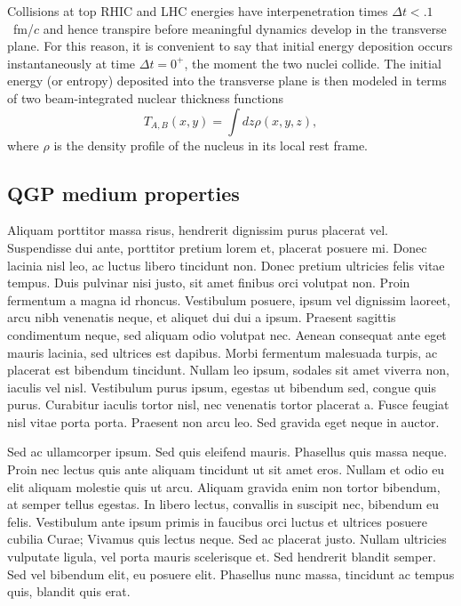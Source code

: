 \documentclass[aps,prc,reprint,amsmath,nofootinbib]{revtex4-1}
\begin{document}
Collisions at top RHIC and LHC energies have interpenetration times \mbox{$\Delta t < .1$~fm/$c$} and hence transpire before meaningful dynamics develop in the transverse plane.
For this reason, it is convenient to say that initial energy deposition occurs instantaneously at time $\Delta t = 0^+$, the moment the two nuclei collide.
The initial energy (or entropy) deposited into the transverse plane is then modeled in terms of two beam-integrated nuclear thickness functions
\begin{equation}
  T_{A,B}(x, y) = \int dz \rho(x, y, z),
\end{equation}
where $\rho$ is the density profile of the nucleus in its local rest frame.

\subsection{QGP medium properties}

Aliquam porttitor massa risus, hendrerit dignissim purus placerat vel. Suspendisse dui ante, porttitor pretium lorem et, placerat posuere mi. Donec lacinia nisl leo, ac luctus libero tincidunt non. Donec pretium ultricies felis vitae tempus. Duis pulvinar nisi justo, sit amet finibus orci volutpat non. Proin fermentum a magna id rhoncus. Vestibulum posuere, ipsum vel dignissim laoreet, arcu nibh venenatis neque, et aliquet dui dui a ipsum. Praesent sagittis condimentum neque, sed aliquam odio volutpat nec. Aenean consequat ante eget mauris lacinia, sed ultrices est dapibus. Morbi fermentum malesuada turpis, ac placerat est bibendum tincidunt. Nullam leo ipsum, sodales sit amet viverra non, iaculis vel nisl. Vestibulum purus ipsum, egestas ut bibendum sed, congue quis purus. Curabitur iaculis tortor nisl, nec venenatis tortor placerat a. Fusce feugiat nisl vitae porta porta. Praesent non arcu leo. Sed gravida eget neque in auctor.

Sed ac ullamcorper ipsum. Sed quis eleifend mauris. Phasellus quis massa neque. Proin nec lectus quis ante aliquam tincidunt ut sit amet eros. Nullam et odio eu elit aliquam molestie quis ut arcu. Aliquam gravida enim non tortor bibendum, at semper tellus egestas. In libero lectus, convallis in suscipit nec, bibendum eu felis. Vestibulum ante ipsum primis in faucibus orci luctus et ultrices posuere cubilia Curae; Vivamus quis lectus neque. Sed ac placerat justo. Nullam ultricies vulputate ligula, vel porta mauris scelerisque et. Sed hendrerit blandit semper. Sed vel bibendum elit, eu posuere elit. Phasellus nunc massa, tincidunt ac tempus quis, blandit quis erat. 
\end{document}
